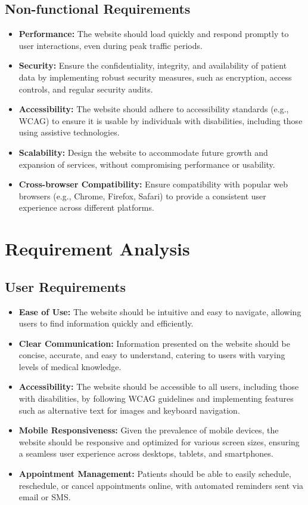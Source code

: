 \documentclass{article}
\begin{document}
\subsection{Non-functional Requirements}
\begin{itemize}
    \item \textbf{Performance:} The website should load quickly and respond promptly to user interactions, even during peak traffic periods.
    \item \textbf{Security:} Ensure the confidentiality, integrity, and availability of patient data by implementing robust security measures, such as encryption, access controls, and regular security audits.
    \item \textbf{Accessibility:} The website should adhere to accessibility standards (e.g., WCAG) to ensure it is usable by individuals with disabilities, including those using assistive technologies.
    \item \textbf{Scalability:} Design the website to accommodate future growth and expansion of services, without compromising performance or usability.
    \item \textbf{Cross-browser Compatibility:} Ensure compatibility with popular web browsers (e.g., Chrome, Firefox, Safari) to provide a consistent user experience across different platforms.
\end{itemize}


\clearpage

\section{Requirement Analysis} \label{sec:requirement_analysis}

\subsection{User Requirements}
\begin{itemize}
    \item \textbf{Ease of Use:} The website should be intuitive and easy to navigate, allowing users to find information quickly and efficiently.
    \item \textbf{Clear Communication:} Information presented on the website should be concise, accurate, and easy to understand, catering to users with varying levels of medical knowledge.
    \item \textbf{Accessibility:} The website should be accessible to all users, including those with disabilities, by following WCAG guidelines and implementing features such as alternative text for images and keyboard navigation.
    \item \textbf{Mobile Responsiveness:} Given the prevalence of mobile devices, the website should be responsive and optimized for various screen sizes, ensuring a seamless user experience across desktops, tablets, and smartphones.
    \item \textbf{Appointment Management:} Patients should be able to easily schedule, reschedule, or cancel appointments online, with automated reminders sent via email or SMS.
\end{itemize}
\end{document}
